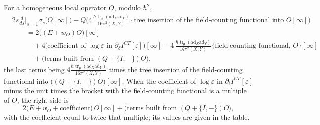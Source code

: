 \begin{theorem}
\label{thm:c6-dil}
For a homogeneous local operator $O$, modulo $\hbar^2$,
\begin{equation}
\begin{aligned}
&2s\frac{d}{ds}\Big|_{s=1}\sigma_s\big(O[\infty]\big)-Q\Big(4\,\frac{\hbar\operatorname{tr}_{\mathfrak g}(\mathrm{ad}_X\mathrm{ad}_Y)}{16\pi^2(X,Y)}\cdot\text{tree insertion of the field-counting functional into }O[\infty]\Big)\\
&\qquad=2\big((E+w_O)O\big)[\infty]\\
&\qquad\quad+4\big(\text{coefficient of }\log\varepsilon\text{ in }\partial_\delta I^{CT}[\varepsilon]\big)[\infty]-4\,\frac{\hbar\operatorname{tr}_{\mathfrak g}(\mathrm{ad}_X\mathrm{ad}_Y)}{16\pi^2(X,Y)}\big\{\text{field-counting functional},\,O\big\}[\infty]\\
&\qquad\quad+\big(\text{terms built from }(Q+\{I,-\})O\big),
\end{aligned}
\label{eq:c6-dil}
\end{equation}
the last terms being $4\frac{\hbar\operatorname{tr}_{\mathfrak g}(\mathrm{ad}_X\mathrm{ad}_Y)}{16\pi^2(X,Y)}$ times the tree insertion of the field-counting functional into $\big((Q+\{I,-\})O\big)[\infty]$. When the coefficient of $\log\varepsilon$ in $\partial_\delta I^{CT}[\varepsilon]$ minus the unit times the bracket with the field-counting functional is a multiple of $O$, the right side is
\[
2\big(E+w_O+\text{coefficient}\big)\,O[\infty]+\big(\text{terms built from }(Q+\{I,-\})O\big),
\]
with the coefficient equal to twice that multiple; its values are given in the table.


\end{theorem}
